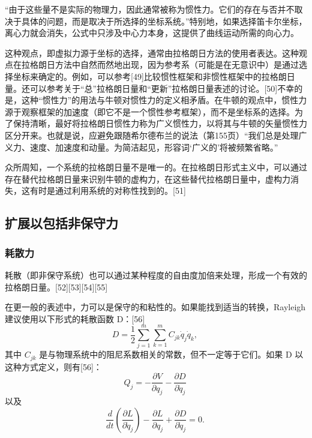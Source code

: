 “由于这些量不是实际的物理力，因此通常被称为惯性力。它们的存在与否并不取决于具体的问题，而是取决于所选择的坐标系统。”特别地，如果选择笛卡尔坐标，离心力就会消失，公式中只涉及中心力本身，这提供了曲线运动所需的向心力。

这种观点，即虚拟力源于坐标的选择，通常由拉格朗日方法的使用者表达。这种观点在拉格朗日方法中自然而然地出现，因为参考系（可能是在无意识中）是通过选择坐标来确定的。例如，可以参考[49]比较惯性框架和非惯性框架中的拉格朗日量。还可以参考关于“总”拉格朗日量和“更新”拉格朗日量表述的讨论。[50]不幸的是，这种“惯性力”的用法与牛顿对惯性力的定义相矛盾。在牛顿的观点中，惯性力源于观察框架的加速度（即它不是一个惯性参考框架），而不是坐标系的选择。为了保持清晰，最好将拉格朗日惯性力称为广义惯性力，以将其与牛顿的矢量惯性力区分开来。也就是说，应避免跟随希尔德布兰的说法（第155页）“我们总是处理广义力、速度、加速度和动量。为简洁起见，形容词‘广义的’将被频繁省略。”

众所周知，一个系统的拉格朗日量不是唯一的。在拉格朗日形式主义中，可以通过存在替代拉格朗日量来识别牛顿的虚构力，在这些替代拉格朗日量中，虚构力消失，这有时是通过利用系统的对称性找到的。[51]
\subsection{扩展以包括非保守力}
\subsubsection{耗散力}
耗散（即非保守系统）也可以通过某种程度的自由度加倍来处理，形成一个有效的拉格朗日量。[52][53][54][55]

在更一般的表述中，力可以是保守的和粘性的。如果能找到适当的转换，Rayleigh 建议使用以下形式的耗散函数 D：[56]
\[ D = \frac{1}{2} \sum_{j=1}^{m} \sum_{k=1}^{m} C_{jk} \dot{q}_{j} \dot{q}_{k},~ \]
其中 \( C_{jk} \) 是与物理系统中的阻尼系数相关的常数，但不一定等于它们。如果 D 以这种方式定义，则有[56]：
\[ Q_{j} = -\frac{\partial V}{\partial q_{j}} - \frac{\partial D}{\partial \dot{q}_{j}} ~\]
以及
\[ \frac{d}{dt} \left( \frac{\partial L}{\partial \dot{q}_{j}} \right) - \frac{\partial L}{\partial q_{j}} + \frac{\partial D}{\partial \dot{q}_{j}} = 0.~ \]